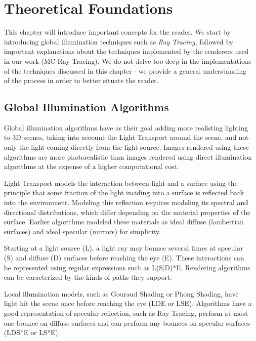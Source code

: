 \chapter{Theoretical Foundations}
\label{sec:theory}

This chapter will introduce important concepts for the reader. We start by introducing global illumination techniques such as \textit{Ray Tracing}, followed by important explanations about the techniques implemented by the renderers used in our work (MC Ray Tracing). We do not delve too deep in the implementations of the techniques discussed in this chapter - we provide a general understanding of the process in order to better situate the reader.

\section{Global Illumination Algorithms}

Global illumination algorithms have as their goal adding more realisting lighting to 3D scenes, taking into account the Light Transport around the scene, and not only the light coming directly from the light source. Images rendered using these algorithms are more photorealistic than images rendered using direct illumination algorithms at the expense of a higher computational cost. 

Light Transport models the interaction between light and a surface using the principle that some fraction of the light inciding into a surface is reflected back into the environment. Modeling this reflection requires modeling its spectral and directional distributions, which differ depending on the material properties of the surface. Earlier algorithms modeled these materials as ideal diffuse (lambertian surfaces) and ideal specular (mirrors) for simplicity.

Starting at a light source (L), a light ray may bounce several times at specular (S) and diffuse (D) surfaces before reaching the eye (E). These interactions can be represented using regular expressions such as L(S|D)*E. Rendering algorithms can be caracterized by the kinds of paths they support.

Local illumination models, such as Gouraud Shading or Phong Shading, have light hit the scene once before reaching the eye (LDE or LSE). Algorithms have a good representation of specular reflection, such as Ray Tracing, perform at most one bounce on diffuse surfaces and can perform any bounces on specular surfaces (LDS*E or LS*E).

